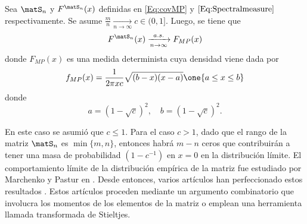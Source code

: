 \begin{theorem}\label{Th:MP1}
    Sea $\matS_n$ y $F^{\matS_n}(x)$ definidas en \eqref{Eq:covMP} y $\eqref{Eq:Spectralmeasure}$ respectivamente. Se asume $\frac{m}{n}\xrightarrow[n\to\infty]{} c\in(0,1]$. Luego, se tiene que 
    \begin{equation}
        F^{\matS_n}(x)\xrightarrow[n\to\infty]{a.s.}F_{MP}(x)
        \label{Eq:MP_law}
    \end{equation}
    donde $F_{MP}(x)$ es una medida determinista cuya densidad viene dada por
    \begin{equation}
        f_{MP}(x) = \frac{1}{2\pi x c}\sqrt{(b-x)(x-a)}\one\{a\le x \le b\}
        \label{Eq:MP_law2}
    \end{equation}
    donde 
    \[a = (1-\sqrt{c})^2, \quad b = (1-\sqrt{c})^2.\]
\end{theorem}
En este caso se asumió que $c\le 1$. Para el caso $c>1$, dado que el rango de la matriz $\matS_n$ es $\min\{m,n\}$, entonces habrá $m-n$ ceros que contribuirán a tener una masa de probabilidad $(1-c^{-1})$ en $x=0$ en la distribución límite.
El comportamiento límite de la distribución empírica de la matriz fue estudiado por Marchenko y Pastur en \cite{Marchenko1967}. Desde entonces, varios artículos han perfeccionado estos resultados \cite{Bai2010}. Estos artículos proceden mediante un argumento combinatorio que involucra los momentos de los elementos de la matriz o emplean una herramienta llamada transformada de Stieltjes.

